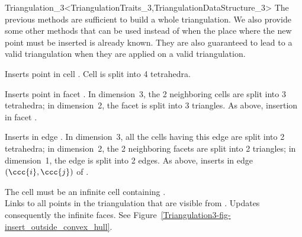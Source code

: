 \begin{ccRefClass}{Triangulation_3<TriangulationTraits_3,TriangulationDataStructure_3>}
The previous methods are sufficient to build a whole triangulation. We
also provide some other methods that can be used instead of
 when the place where the new point  must be inserted
is already known. They are also guaranteed to lead to a valid
triangulation when they are applied on a valid triangulation.

{Inserts point  in cell . Cell  is split into 4
tetrahedra.
} 

{Inserts point  in facet . In dimension~3, the 2
neighboring cells are split into 3 tetrahedra; in dimension~2, the facet 
is split into 3 triangles.
}
\ccGlue
{}
{As above, insertion in facet .
}

{Inserts  in edge . In dimension~3, 
all the cells having this edge are split into 2 tetrahedra; in
dimension~2, the 2 neighboring facets are split into 2 triangles; in
dimension~1, the edge is split into 2 edges.
}
\ccGlue
{} 
{As above, inserts  in edge $(\ccc{i}, \ccc{j})$ of .
} 

{%
The cell  must be an infinite cell containing .\\
Links  to all  points in the triangulation that are visible from
. Updates consequently the infinite faces. See
Figure~\ref{Triangulation3-fig-insert_outside_convex_hull}.
}


\end{ccRefClass}

